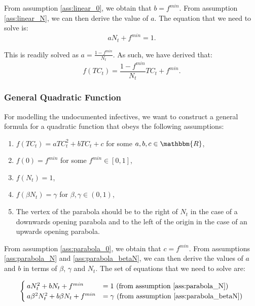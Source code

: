 \documentclass[12pt]{article}
\newcommand{\R}{\mathbbm{R}}
\begin{document}
\begin{appendices}
		From assumption \ref{ass:linear_0}, we obtain that $b = f^{min}$. From assumption \ref{ass:linear_N}, we can then derive the value of $a$. The equation that we need to solve is:
		    \[aN_t + f^{min} = 1.\]
		    
		\noindent This is readily solved as $a = \frac{1-f^{min}}{N_t}$. As such, we have derived that:
		    \[f(TC_t) = \frac{1-f^{min}}{N_t}TC_t + f^{min}.\]
		
		\subsubsection{General Quadratic Function} \label{ssapp:quadratic_derivation}
		For modelling the undocumented infectives, we want to construct a general formula for a quadratic function that obeys the following assumptions:
		\begin{enumerate}[label=(\Roman*)]
		    \item\label{ass:parabola_formula} $f(TC_t) = aTC_t^2 + bTC_t + c$ for some $a, b, c \in \R$,
		    \item\label{ass:parabola_0} $f(0) = f^{min}$ for some $f^{min} \in [0,1]$,
		    \item\label{ass:parabola_N} $f(N_t) = 1$,
		    \item\label{ass:parabola_betaN} $f(\beta N_t) = \gamma$ for $\beta, \gamma \in (0,1)$,
		    \item\label{ass:parabola_vertex} The vertex of the parabola should be to the right of $N_t$ in the case of a downwards opening parabola and to the left of the origin in the case of an upwards opening parabola.
		\end{enumerate}
		
		From assumption \ref{ass:parabola_0}, we obtain that $c = f^{min}$. From assumptions \ref{ass:parabola_N} and \ref{ass:parabola_betaN}, we can then derive the values of $a$ and $b$ in terms of $\beta$, $\gamma$ and $N_t$. The set of equations that we need to solve are:
		
		\begin{equation} \label{eq:set_parabola}
		    \begin{cases}
		        aN_t^2 + bN_t + f^{min} &= 1 \text{ (from assumption \ref{ass:parabola_N})}\\
		        a\beta^2 N_t^2 + b\beta N_t + f^{min} &= \gamma \text{ (from assumption \ref{ass:parabola_betaN})}
		    \end{cases}
		\end{equation}
		

\end{appendices}
\end{document}
